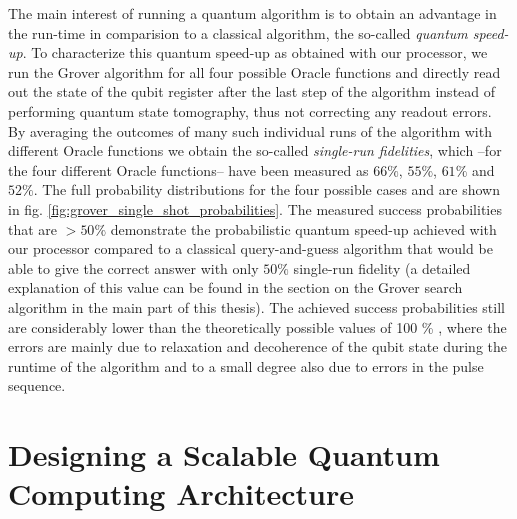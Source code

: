 The main interest of running a quantum algorithm is to obtain an advantage in the run-time in comparision to a classical algorithm, the so-called {\it quantum speed-up}. To characterize this quantum speed-up as obtained with our processor, we run the Grover algorithm for all four possible Oracle functions and directly read out the state of the qubit register after the last step of the algorithm instead of performing quantum state tomography, thus not correcting any readout errors. By averaging the outcomes of many such individual runs of the algorithm with different Oracle functions we obtain the so-called {\it single-run fidelities}, which --for the four different Oracle functions-- have been measured as $66 \%$, $55\%$, $61\%$ and $52\%$. The full probability distributions for the four possible cases and are shown in fig. \ref{fig:grover_single_shot_probabilities}. The measured success probabilities that are $> 50 \%$ demonstrate the probabilistic quantum speed-up achieved with our processor compared to a classical query-and-guess algorithm that would be able to give the correct answer with only $50\%$ single-run fidelity (a detailed explanation of this value can be found in the section on the Grover search algorithm in the main part of this thesis). The achieved success probabilities still are considerably lower than the theoretically possible values of 100 \% , where the errors are mainly due to relaxation and decoherence of the qubit state during the runtime of the algorithm and to a small degree also due to errors in the pulse sequence.

\section{Designing a Scalable Quantum Computing Architecture}

